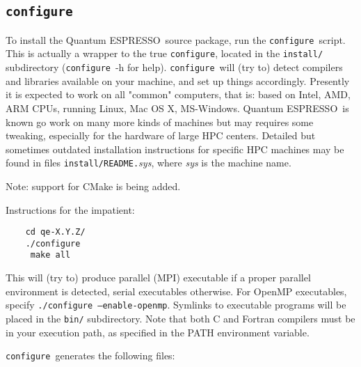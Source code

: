 \documentclass[12pt,a4paper]{article}
\def\qe{{\sc Quantum ESPRESSO}}
\def\configure{\texttt{configure}}
\begin{document}
\subsection{\configure}

To install the \qe\ source package, run the \configure{}ript. This is actually a wrapper to the true \configure,
located in the \texttt{install/} subdirectory (\configure\ -h for help).
\configure\ will (try to) detect compilers and libraries available on
your machine, and set up things accordingly. Presently it is expected
to work on all "common" computers, that is: based on Intel, AMD, ARM
CPUs, running Linux, Mac OS X, MS-Windows. \qe\ is known go work on many
more kinds of machines but may requires some tweaking, especially for
the hardware of large HPC centers. Detailed but sometimes outdated 
installation instructions for specific HPC machines may be found in 
files \texttt{install/README.}{\em sys}, where {\em sys} is the machine name.

Note: support for CMake is being added.

Instructions for the impatient:
\begin{verbatim}
    cd qe-X.Y.Z/
    ./configure
     make all
\end{verbatim}
This will (try to) produce parallel (MPI) executable if a proper parallel
environment is detected, serial executables otherwise. For OpenMP executables,
specify \texttt{./configure --enable-openmp}. Symlinks to executable programs
will be placed in the \texttt{bin/}
subdirectory. Note that both C and Fortran compilers must be in your execution
path, as specified in the PATH environment variable.

\noindent \configure\ generates the following files:
\end{document}
